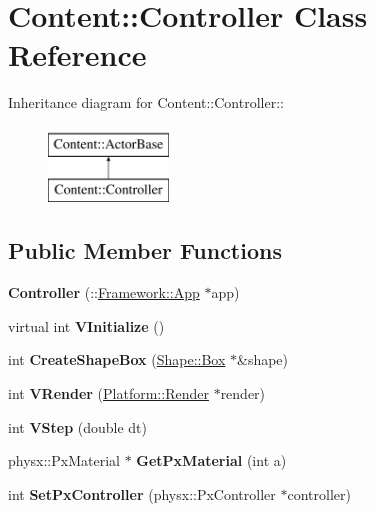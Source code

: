 \hypertarget{classContent_1_1Controller}{
\section{Content::Controller Class Reference}
\label{classContent_1_1Controller}
}
Inheritance diagram for Content::Controller::\begin{figure}[H]
\begin{center}
\leavevmode
\includegraphics[height=2cm]{classContent_1_1Controller}
\end{center}
\end{figure}
\subsection*{Public Member Functions}
\begin{DoxyCompactItemize}
\item 
\hypertarget{classContent_1_1Controller_ab532048e1ea4ce0cc9c76d42fe7d953c}{
{\bfseries Controller} (::\hyperlink{classFramework_1_1App}{Framework::App} $\ast$app)}
\label{classContent_1_1Controller_ab532048e1ea4ce0cc9c76d42fe7d953c}

\item 
\hypertarget{classContent_1_1Controller_af09add78fc6e2f9c735ad0b0c51be2c4}{
virtual int {\bfseries VInitialize} ()}
\label{classContent_1_1Controller_af09add78fc6e2f9c735ad0b0c51be2c4}

\item 
\hypertarget{classContent_1_1Controller_aec516d4853da325756e377039f71b862}{
int {\bfseries CreateShapeBox} (\hyperlink{classContent_1_1Shape_1_1Box}{Shape::Box} $\ast$\&shape)}
\label{classContent_1_1Controller_aec516d4853da325756e377039f71b862}

\item 
\hypertarget{classContent_1_1Controller_af1fff729e242a08a85a5ecac9c22b13c}{
int {\bfseries VRender} (\hyperlink{classPlatform_1_1Render}{Platform::Render} $\ast$render)}
\label{classContent_1_1Controller_af1fff729e242a08a85a5ecac9c22b13c}

\item 
\hypertarget{classContent_1_1Controller_a600501d5bcb422f0b3a1132c0b42856a}{
int {\bfseries VStep} (double dt)}
\label{classContent_1_1Controller_a600501d5bcb422f0b3a1132c0b42856a}

\item 
\hypertarget{classContent_1_1Controller_adfdfb6507bf390e4fd1755eed0af5d23}{
physx::PxMaterial $\ast$ {\bfseries GetPxMaterial} (int a)}
\label{classContent_1_1Controller_adfdfb6507bf390e4fd1755eed0af5d23}

\item 
\hypertarget{classContent_1_1Controller_a4769ed97d3c213c87006e5a2f3ce8c8e}{
int {\bfseries SetPxController} (physx::PxController $\ast$controller)}
\label{classContent_1_1Controller_a4769ed97d3c213c87006e5a2f3ce8c8e}

\end{DoxyCompactItemize}
